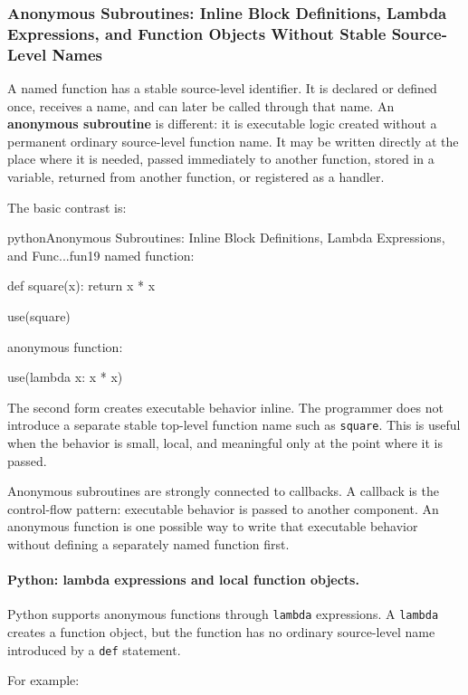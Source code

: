 \subsubsection{Anonymous Subroutines: Inline Block Definitions, Lambda Expressions, and Function Objects Without Stable Source-Level Names}

A named function has a stable source-level identifier. It is declared or defined once, receives a name, and can later be called through that name. An \textbf{anonymous subroutine} is different: it is executable logic created without a permanent ordinary source-level function name. It may be written directly at the place where it is needed, passed immediately to another function, stored in a variable, returned from another function, or registered as a handler.

The basic contrast is:

\begin{codebox}[]{python}{Anonymous Subroutines: Inline Block Definitions, Lambda Expressions, and Func...}{fun19}
named function:

def square(x):
    return x * x

use(square)


anonymous function:

use(lambda x: x * x)
\end{codebox}


The second form creates executable behavior inline. The programmer does not introduce a separate stable top-level function name such as \texttt{square}. This is useful when the behavior is small, local, and meaningful only at the point where it is passed.

Anonymous subroutines are strongly connected to callbacks. A callback is the control-flow pattern: executable behavior is passed to another component. An anonymous function is one possible way to write that executable behavior without defining a separately named function first.

\paragraph{Python: lambda expressions and local function objects.}

Python supports anonymous functions through \texttt{lambda} expressions. A \texttt{lambda} creates a function object, but the function has no ordinary source-level name introduced by a \texttt{def} statement.

For example:


